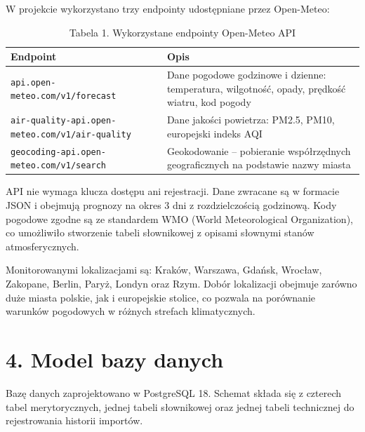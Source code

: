 \documentclass[12pt, a4paper]{article}
\begin{document}
W projekcie wykorzystano trzy endpointy udostępniane przez Open-Meteo:

\begin{table}[H]
\centering
\begin{tabularx}{\textwidth}{|l|X|}
\hline
\textbf{Endpoint} & \textbf{Opis} \\
\hline
\texttt{api.open-meteo.com/v1/forecast} & Dane pogodowe godzinowe i dzienne: temperatura, wilgotność, opady, prędkość wiatru, kod pogody \\
\hline
\texttt{air-quality-api.open-meteo.com/v1/air-quality} & Dane jakości powietrza: PM2.5, PM10, europejski indeks AQI \\
\hline
\texttt{geocoding-api.open-meteo.com/v1/search} & Geokodowanie -- pobieranie współrzędnych geograficznych na podstawie nazwy miasta \\
\hline
\end{tabularx}
\caption{Tabela 1. Wykorzystane endpointy Open-Meteo API}
\end{table}

API nie wymaga klucza dostępu ani rejestracji. Dane zwracane są w formacie JSON
i obejmują prognozy na okres 3 dni z rozdzielczością godzinową. Kody pogodowe
zgodne są ze standardem WMO (World Meteorological Organization), co umożliwiło
stworzenie tabeli słownikowej z opisami słownymi stanów atmosferycznych.

Monitorowanymi lokalizacjami są: Kraków, Warszawa, Gdańsk, Wrocław, Zakopane,
Berlin, Paryż, Londyn oraz Rzym. Dobór lokalizacji obejmuje zarówno duże miasta
polskie, jak i europejskie stolice, co pozwala na porównanie warunków pogodowych
w różnych strefach klimatycznych.


\section*{\textbf{4. Model bazy danych}}

Bazę danych zaprojektowano w PostgreSQL 18. Schemat składa się z czterech tabel
merytorycznych, jednej tabeli słownikowej oraz jednej tabeli technicznej do
rejestrowania historii importów.
\end{document}
